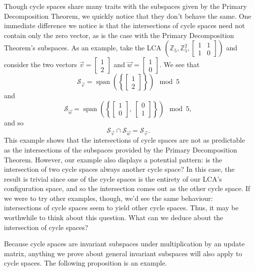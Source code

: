 \documentclass[a4paper, 12pt, reqno]{amsart}
\DeclareMathOperator{\Span}{span}
\newcommand{\Z}{\mathbb{Z}}
\newcommand\smallmat[1]{\left[\begin{smallmatrix}#1\end{smallmatrix}\right]}
\begin{document}
	Though cycle spaces share many traits with the subspaces given by the Primary Decomposition Theorem, we quickly notice that they don't behave the same. One immediate 
	difference we notice is that the intersections of cycle spaces need not contain only the zero vector, as is the case with the Primary Decomposition Theorem's subspaces. 
	As an example, take the LCA $\left(\Z_5, \Z_5^2, \smallmat{1 & 1 \\ 1 & 0}\right)$ and consider the two vectors $\vec{v} = \smallmat{1 \\ 2}$ and 
	$\vec{w} = \smallmat{1 \\ 0}$. We see that
	\[
		\mathcal{S}_{\vec{v}} = \Span\!\left(\left\{\begin{bmatrix}1 \\ 2\end{bmatrix}\right\}\right) \mod{5}
	\]
	and
	\[
		\mathcal{S}_{\vec{w}} = \Span\!\left(\left\{\begin{bmatrix}1 \\ 0\end{bmatrix}\!\!,\ \begin{bmatrix}0 \\ 1\end{bmatrix}\right\}\right) \mod{5},
	\]
	and so
	\[
		\mathcal{S}_{\vec{v}} \cap \mathcal{S}_{\vec{w}} = \mathcal{S}_{\vec{v}}.
	\]
	This example shows that the intersections of cycle spaces are not as predictable as the intersections of the subspaces provided by the Primary Decomposition Theorem. 
	However, our example also displays a potential pattern: is the intersection of two cycle spaces always another cycle space? In this case, the result is trivial since one
	of the cycle spaces is the entirety of our LCA's configuration space, and so the intersection comes out as the other cycle space. If we were to try other examples, though,
	we'd see the same behaviour: intersections of cycle spaces seem to yield other cycle spaces. Thus, it may be worthwhile to think about this question. What can we deduce 
	about the intersection of cycle spaces?
	
	Because cycle spaces are invariant subspaces under multiplication by an update matrix, anything we prove about general invariant subspaces will also apply to cycle spaces.
	The following proposition is an example.
	
\end{document}
